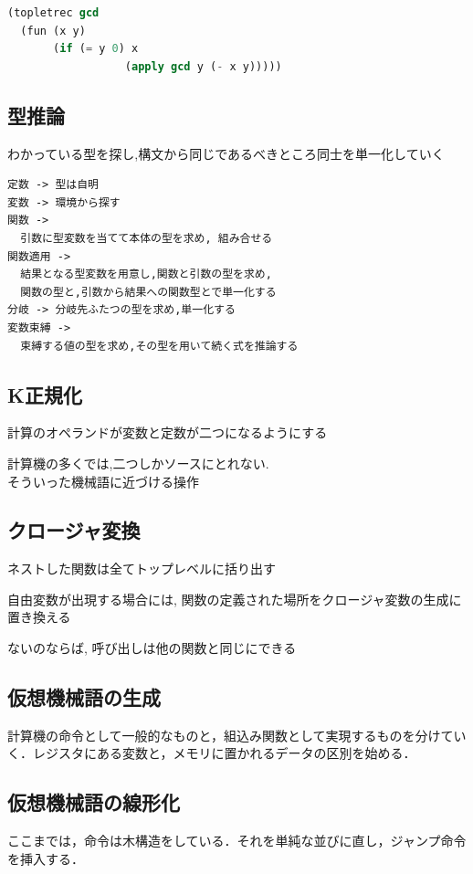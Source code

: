 \documentclass[papersize,30pt,slide]{jsarticle}
\begin{document}
\begin{lstlisting}[language=Lisp,columns=fullflexible,morekeywords={topletrec,fun,if},deletekeywords={gcd}]
(topletrec gcd
  (fun (x y)
       (if (= y 0) x
                  (apply gcd y (- x y)))))
\end{lstlisting}

\newpage
\subsection{型推論}
わかっている型を探し,構文から同じであるべきところ同士を単一化していく
\begin{lstlisting}
定数 -> 型は自明
変数 -> 環境から探す
関数 ->
  引数に型変数を当てて本体の型を求め, 組み合せる
関数適用 ->
  結果となる型変数を用意し,関数と引数の型を求め,
  関数の型と,引数から結果への関数型とで単一化する
分岐 -> 分岐先ふたつの型を求め,単一化する
変数束縛 ->
  束縛する値の型を求め,その型を用いて続く式を推論する
\end{lstlisting}

\newpage
\subsection{K正規化}
計算のオペランドが変数と定数が二つになるようにする

計算機の多くでは,二つしかソースにとれない. \\
そういった機械語に近づける操作

\subsection{クロージャ変換}
ネストした関数は全てトップレベルに括り出す

自由変数が出現する場合には, 関数の定義された場所をクロージャ変数の生成に置き換える

ないのならば, 呼び出しは他の関数と同じにできる

\newpage

\subsection{仮想機械語の生成}
計算機の命令として一般的なものと，組込み関数として実現するものを分けてい
く．レジスタにある変数と，メモリに置かれるデータの区別を始める．

\subsection{仮想機械語の線形化}
ここまでは，命令は木構造をしている．それを単純な並びに直し，ジャンプ命令
を挿入する．
\end{document}
